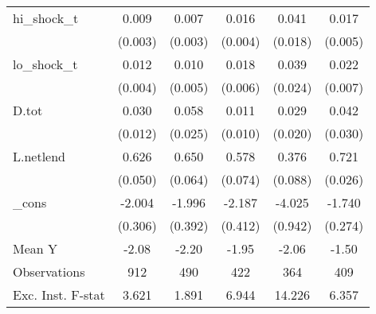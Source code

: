 {\begin{tabular}{l*{5}{c}}
\addlinespace
hi\_shock\_t  &       0.009\sym{***}&       0.007\sym{**} &       0.016\sym{***}&       0.041\sym{**} &       0.017\sym{***}\\
            &     (0.003)         &     (0.003)         &     (0.004)         &     (0.018)         &     (0.005)         \\
\addlinespace
lo\_shock\_t  &       0.012\sym{***}&       0.010\sym{**} &       0.018\sym{***}&       0.039         &       0.022\sym{***}\\
            &     (0.004)         &     (0.005)         &     (0.006)         &     (0.024)         &     (0.007)         \\
\addlinespace
D.tot       &       0.030\sym{**} &       0.058\sym{**} &       0.011         &       0.029         &       0.042         \\
            &     (0.012)         &     (0.025)         &     (0.010)         &     (0.020)         &     (0.030)         \\
\addlinespace
L.netlend   &       0.626\sym{***}&       0.650\sym{***}&       0.578\sym{***}&       0.376\sym{***}&       0.721\sym{***}\\
            &     (0.050)         &     (0.064)         &     (0.074)         &     (0.088)         &     (0.026)         \\
\addlinespace
\_cons      &      -2.004\sym{***}&      -1.996\sym{***}&      -2.187\sym{***}&      -4.025\sym{***}&      -1.740\sym{***}\\
            &     (0.306)         &     (0.392)         &     (0.412)         &     (0.942)         &     (0.274)         \\
\midrule
Mean Y      &       -2.08         &       -2.20         &       -1.95         &       -2.06         &       -1.50         \\
Observations&         912         &         490         &         422         &         364         &         409         \\
Exc. Inst. F-stat&       3.621         &       1.891         &       6.944         &      14.226         &       6.357         \\
\bottomrule
\end{tabular}
}
